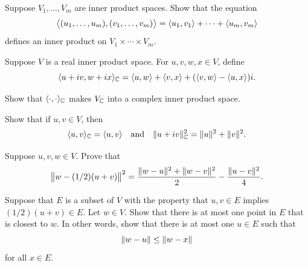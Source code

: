 \begin{exc}
\begin{exercise}
Suppose $V_1,\dots,V_m$ are inner product spaces. Show that the equation
\[ \bigl\langle(u_1,\dots,u_m),(v_1,\dots,v_m)\bigr\rangle
   = \langle u_1, v_1 \rangle+\cdots+\langle u_m, v_m \rangle \]
defines an inner product on $V_1\times\cdots\times V_m$.
\end{exercise}

\begin{exercise}
Suppose $V$ is a real inner product space. For $u,v,w,x\in V$, define
\[ \langle u+iv, w+ix \rangle_{\mathbb{C}} = \langle u, w \rangle+\langle v, x \rangle+(\langle v, w \rangle-\langle u, x \rangle)i. \]
\begin{parts}
\item Show that $\langle \cdot, \cdot \rangle_{\mathbb{C}}$ makes $V_{\mathbb{C}}$ into a complex inner product
  space.
\item Show that if $u,v\in V$, then
  \[ \langle u, v \rangle_{\mathbb{C}} = \langle u, v \rangle \quad\text{and}\quad
     \lVert u+iv \rVert_{\mathbb{C}}^2 = \lVert u \rVert^2+\lVert v \rVert^2. \]
\end{parts}
\end{exercise}

\begin{exercise}
Suppose $u,v,w\in V$. Prove that
\[ \bigl\lVert w-(1/2)(u+v)\bigr\rVert^2
   = \frac{\lVert w-u \rVert^2+\lVert w-v \rVert^2}{2}-\frac{\lVert u-v \rVert^2}{4}. \]
\end{exercise}

\begin{exercise}
Suppose that $E$ is a subset of $V$ with the property that $u,v\in E$ implies
$(1/2)(u+v)\in E$. Let $w\in V$. Show that there is at most one point in $E$
that is closest to $w$. In other words, show that there is at most one $u\in E$
such that
\[ \lVert w-u \rVert \le \lVert w-x \rVert \]
for all $x\in E$.
\end{exercise}


\end{exc}
